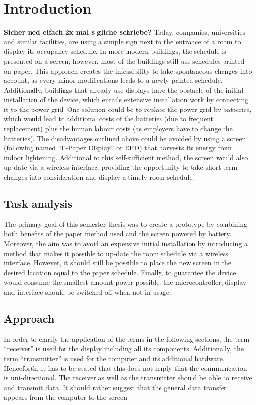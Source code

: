\chapter{Introduction}
\textbf{Sicher ned eifach 2x mal s gliche schriebe?}
Today, companies, universities and similar facilities, are using a simple sign next to the entrance of a room to display its occupancy schedule. In more modern buildings, the schedule is presented on a screen; however, most of the buildings still use schedules printed on paper. This approach creates the infeasibility to take spontaneous changes into account, as every minor modifications leads to a newly printed schedule. Additionally, buildings that already use displays have the obstacle of the initial installation of the device, which entails extensive installation work by connecting it to the power grid. One solution could be to replace the power grid by batteries, which would lead to additional costs of the batteries (due to frequent replacement) plus the human labour costs (as employers have to change the batteries). The disadvantages outlined above could be avoided by using a screen (following named “E-Paper Display” or EPD) that harvests its energy from indoor lightening. Additional to this self-sufficient method, the screen would also up-date via a wireless interface, providing the opportunity to take short-term changes into consideration and display a timely room schedule.  


\section{Task analysis}
The primary goal of this semester thesis was to create a prototype by combining both benefits of the paper method used and the screen powered by battery. Moreover, the aim was to avoid an expensive initial installation by introducing a method that makes it possible to up-date the room schedule via a wireless interface. However, it should still be possible to place the new screen in the desired location equal to the paper schedule. Finally, to guarantee the device would consume the smallest amount power possible, the microcontroller, display and interface should be switched off when not in usage.  


\section{Approach}
In order to clarify the application of the terms in the following sections, the term “receiver” is used for the display including all its components. Additionally, the term “transmitter” is used for the computer and its additional hardware. Henceforth, it has to be stated that this does not imply that the communication is uni-directional. The receiver as well as the transmitter should be able to receive and transmit data. It should rather suggest that the general data transfer appears from the computer to the screen. 

